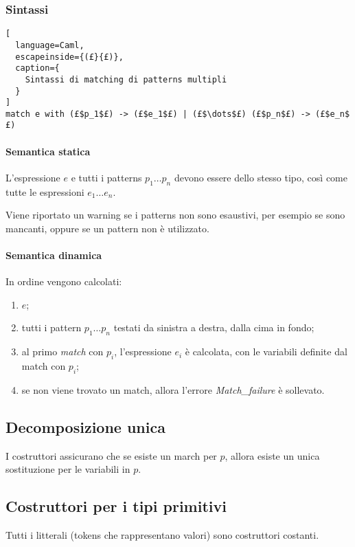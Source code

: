 \subsubsection{Sintassi}
\begin{lstlisting}[
  language=Caml,
  escapeinside={(£}{£)},
  caption={
    Sintassi di matching di patterns multipli
  }
]
match e with (£$p_1$£) -> (£$e_1$£) | (£$\dots$£) (£$p_n$£) -> (£$e_n$£)
\end{lstlisting}

\paragraph{Semantica statica}
L'espressione $e$ e tutti i patterns $p_1\dots p_n$ devono essere dello stesso
tipo, così come tutte le espressioni $e_1\dots e_n$.


Viene riportato un warning se i patterns non sono esaustivi, per esempio
se sono mancanti, oppure se un pattern non è utilizzato.

\paragraph{Semantica dinamica}
In ordine vengono calcolati:
\begin{enumerate}
  \item $e$;
  \item tutti i pattern $p_1\dots p_n$ testati da sinistra a destra, dalla cima
    in fondo;
  \item al primo \emph{match} con $p_i$, l'espressione $e_i$ è calcolata,
    con le variabili definite dal match con $p_i$;
  \item se non viene trovato un match, allora l'errore \emph{Match\_failure}
    è sollevato.
\end{enumerate}

\subsection{Decomposizione unica}
I costruttori assicurano che se esiste un march per $p$, allora esiste un unica sostituzione per le variabili in $p$.

\subsection{Costruttori per i tipi primitivi}
Tutti i litterali (tokens che rappresentano valori) sono costruttori costanti.

